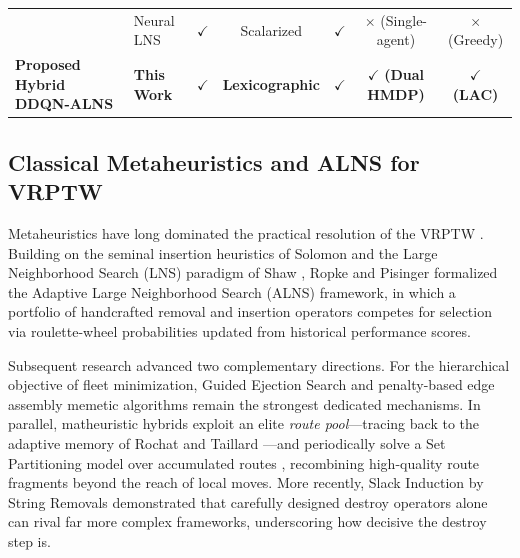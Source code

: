 \documentclass{ieeeaccess}
\begin{document}
\begin{table}[!t]
\begin{tabularx}{\textwidth}{
    l
    X
    c
    c
    c
    c
    c
}
&
Neural LNS \cite{hottung2020neural}
&
$\checkmark$
&
Scalarized
&
$\checkmark$
&
$\times$ (Single-agent)
&
$\times$ (Greedy)
\\

\addlinespace[3pt]

\midrule

\textbf{Proposed Hybrid DDQN-ALNS}
&
\textbf{This Work}
&
$\mathbf{\checkmark}$
&
\textbf{Lexicographic}
&
$\mathbf{\checkmark}$
&
$\mathbf{\checkmark}$ \textbf{(Dual HMDP)}
&
$\mathbf{\checkmark}$ \textbf{(LAC)}
\\

\bottomrule
\end{tabularx}
\end{table}

\subsection{Classical Metaheuristics and ALNS for VRPTW}
\label{sec:rw_classical}

Metaheuristics have long dominated the practical resolution of the VRPTW
\cite{braysy2005vehicle}. Building on the seminal insertion heuristics of
Solomon \cite{Solomon1987} and the Large Neighborhood Search (LNS)
paradigm of Shaw \cite{shaw1998using}, Ropke and Pisinger
\cite{Ropke2006, pisinger2007general, pisinger2010large} formalized the
Adaptive Large Neighborhood Search (ALNS) framework, in which a portfolio of
handcrafted removal and insertion operators competes for selection via
roulette-wheel probabilities updated from historical performance scores.

Subsequent research advanced two complementary directions. For the
hierarchical objective of fleet minimization, Guided Ejection Search
\cite{nagata2009ges} and penalty-based edge assembly memetic algorithms
\cite{nagata2010srex} remain the strongest dedicated mechanisms. In parallel,
matheuristic hybrids exploit an elite \emph{route pool}---tracing back to the
adaptive memory of Rochat and Taillard \cite{rochat1995probabilistic}---and
periodically solve a Set Partitioning model over accumulated routes
\cite{alvarenga2007genetic, subramanian2013hybrid, vidal2013hybrid},
recombining high-quality route fragments beyond the reach of local moves.
More recently, Slack Induction by String Removals \cite{christiaens2020slack}
demonstrated that carefully designed destroy operators alone can rival far
more complex frameworks, underscoring how decisive the destroy step is.
\end{document}

